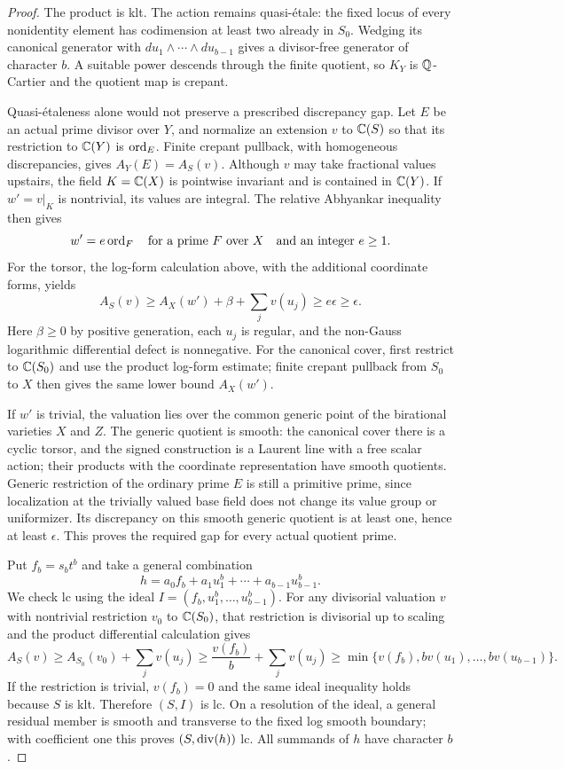\begin{proof}
The product is klt.  The action remains quasi-\'{e}tale: the fixed locus
of every nonidentity element has codimension at least two already in
$S_0$.  Wedging its canonical generator with
$du_1\wedge\cdots\wedge du_{b-1}$ gives a divisor-free generator of
character $b$.  A suitable power descends through the finite quotient,
so $K_Y$ is $\mathbb Q$-Cartier and the quotient map is crepant.

Quasi-\'{e}taleness alone would not preserve a prescribed discrepancy
gap.  Let $E$ be an actual prime divisor over $Y$, and normalize an
extension $v$ to $\mathbb C(S)$ so that its restriction to $\mathbb C(Y)$ is
$\operatorname{ord}_E$.  Finite crepant pullback, with homogeneous discrepancies,
gives $A_Y(E)=A_S(v)$.  Although $v$ may take fractional values upstairs,
the field $K=\mathbb C(X)$ is pointwise invariant and is contained in
$\mathbb C(Y)$.  If $w'=v|_K$ is nontrivial, its values are integral.  The
relative Abhyankar inequality then gives
\[
 w'=e\operatorname{ord}_F\quad\text{for a prime }F\text{ over }X
 \quad\text{and an integer }e\ge1.
\]
For the torsor, the log-form calculation above, with the additional
coordinate forms, yields
\[
 A_S(v)\ge A_X(w')+\beta+\sum_jv(u_j)
          \ge e\epsilon\ge\epsilon.
\]
Here $\beta\ge0$ by positive generation, each $u_j$ is regular, and
the non-Gauss logarithmic differential defect is nonnegative.  For the
canonical cover, first restrict to $\mathbb C(S_0)$ and use the product
log-form estimate; finite crepant pullback from $S_0$ to $X$ then gives
the same lower bound $A_X(w')$.

If $w'$ is trivial, the valuation lies over the common generic point
of the birational varieties $X$ and $Z$.  The generic quotient is smooth: the canonical cover there is
a cyclic torsor, and the signed construction is a Laurent line with a
free scalar action; their products with the coordinate representation
have smooth quotients.  Generic restriction of the ordinary prime
$E$ is still a primitive prime, since localization at the trivially
valued base field does not change its value group or uniformizer.
Its discrepancy on this smooth generic quotient is at least one, hence
at least $\epsilon$.  This proves the required gap for every actual
quotient prime.

Put $f_b=s_bt^b$ and take a general combination
\begin{equation}\label{eq:H-h-function}
 h=a_0 f_b+a_1u_1^b+\cdots+a_{b-1}u_{b-1}^b.
\end{equation}
We check lc using the ideal $I=(f_b,u_1^b,\ldots,u_{b-1}^b)$.
For any divisorial valuation $v$ with nontrivial restriction $v_0$ to
$\mathbb C(S_0)$, that restriction is divisorial up to scaling and the
product differential calculation gives
\[
 A_S(v)\ge A_{S_0}(v_0)+\sum_jv(u_j)
 \ge \frac{v(f_b)}b+\sum_jv(u_j)
 \ge \min\{v(f_b),bv(u_1),\ldots,bv(u_{b-1})\}.
\]
If the restriction is trivial, $v(f_b)=0$ and the same ideal inequality
holds because $S$ is klt.  Therefore $(S,I)$ is lc.  On a resolution of
the ideal, a general residual member is smooth and transverse to the
fixed log smooth boundary; with coefficient one this proves
$(S,\operatorname{div}(h))$ lc.  All summands of $h$ have character $b$.


\end{proof}
